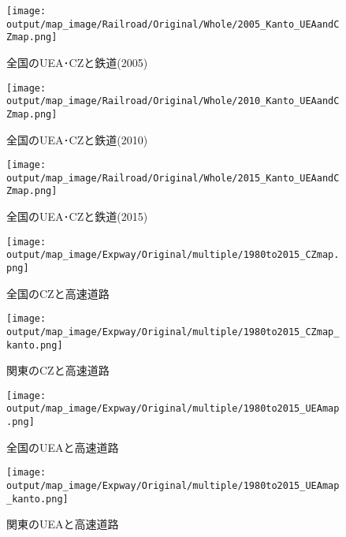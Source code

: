 \documentclass{ltjsarticle}
\begin{document}
\begin{figure}[pbth]
  \centering
  \texttt{[image: output/map\_image/Railroad/Original/Whole/2005\_Kanto\_UEAandCZmap.png]}
  \caption{\label{2005:allCZandUEA}全国のUEA･CZと鉄道(2005)}
\end{figure}


\begin{figure}[pbth]
  \centering
  \texttt{[image: output/map\_image/Railroad/Original/Whole/2010\_Kanto\_UEAandCZmap.png]}
  \caption{\label{2010:allCZandUEA}全国のUEA･CZと鉄道(2010)}
\end{figure}


\begin{figure}[pbth]
  \centering
  \texttt{[image: output/map\_image/Railroad/Original/Whole/2015\_Kanto\_UEAandCZmap.png]}
  \caption{\label{2015:allCZandUEA}全国のUEA･CZと鉄道(2015)}
\end{figure}




\begin{figure}[pbth]
  \centering
  \texttt{[image: output/map\_image/Expway/Original/multiple/1980to2015\_CZmap.png]}
  \caption{\label{allCZandExpway}全国のCZと高速道路}
\end{figure}

\begin{figure}[pbth]
  \centering
  \texttt{[image: output/map\_image/Expway/Original/multiple/1980to2015\_CZmap\_kanto.png]}
  \caption{\label{KanCZandExpway}関東のCZと高速道路}
\end{figure}


\begin{figure}[pbth]
  \centering
  \texttt{[image: output/map\_image/Expway/Original/multiple/1980to2015\_UEAmap.png]}
  \caption{\label{allUEAandExpway}全国のUEAと高速道路}
\end{figure}


\begin{figure}[pbth]
  \centering
  \texttt{[image: output/map\_image/Expway/Original/multiple/1980to2015\_UEAmap\_kanto.png]}
  \caption{\label{KanUEAandExpway}関東のUEAと高速道路}
\end{figure}
\end{document}
